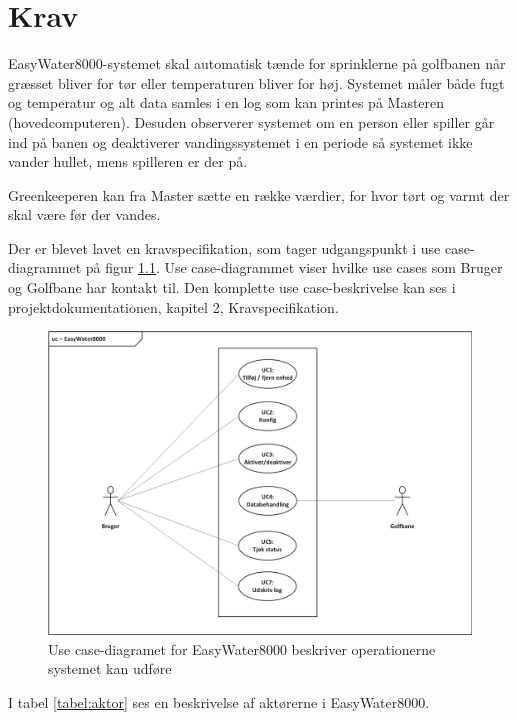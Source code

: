 \chapter{Krav}
EasyWater8000-systemet skal automatisk tænde for sprinklerne på golfbanen når græsset bliver for tør eller temperaturen bliver for høj. Systemet måler både fugt og temperatur og alt data samles i en log som kan printes på Masteren (hovedcomputeren).  Desuden observerer systemet om en person eller spiller går ind på banen og deaktiverer vandingssystemet i en periode så systemet ikke vander hullet, mens spilleren er der på. 

Greenkeeperen kan fra Master sætte en række værdier, for hvor tørt og varmt der skal være før der vandes.

Der er blevet lavet en kravspecifikation, som tager udgangspunkt i use case-diagrammet på figur \ref{lab:usecasediagram}. Use case-diagrammet viser hvilke use cases som Bruger og Golfbane har kontakt til. Den komplette use case-beskrivelse kan ses i projektdokumentationen, kapitel 2, Kravspecifikation. 

\begin{figure}[H] \centering
\vspace*{\fill}
\includegraphics[width=\textwidth]{Billeder/Usecase_Diagram}
\caption{Use case-diagramet for EasyWater8000 beskriver operationerne systemet kan udføre}
\label{lab:usecasediagram}
\vspace*{\fill}
\end{figure}

I tabel \ref{tabel:aktor} ses en beskrivelse af aktørerne i EasyWater8000.

